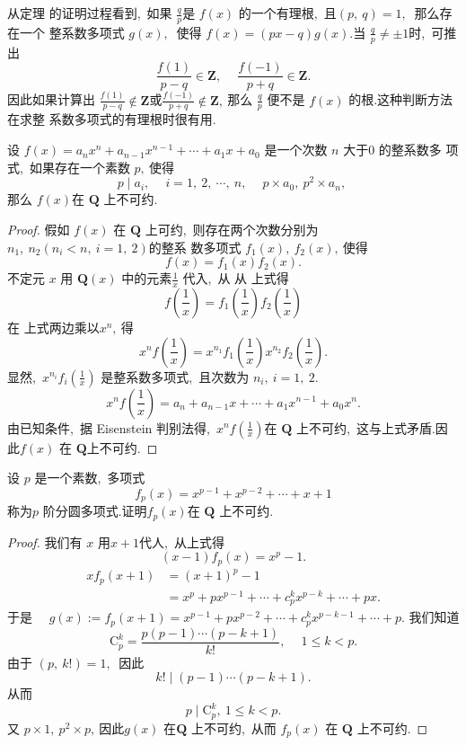 \begin{note}
	从定理  的证明过程看到,\  如果 $ \frac{q}{p}  $是  $f(x)$  的一个有理根,\  且$  (p,\  q)=1 ,\ $ 那么存在一个 整系数多项式 $ g(x) ,\ $ 使得 $ f(x)=(p x-q) g(x)  .$当 $ \frac{q}{p} \neq \pm 1  $时,\  可推出
	$$\frac{f(1)}{p-q} \in \mathbf{Z},\  \quad \frac{f(-1)}{p+q} \in \mathbf{Z} .$$
	因此如果计算出 $ \frac{f(1)}{p-q} \notin \mathbf{Z}  $或$  \frac{f(-1)}{p+q} \notin \mathbf{Z} ,\  $那么 $ \frac{q}{p}$  便不是 $ f(x) $ 的根.这种判断方法在求整 系数多项式的有理根时很有用.
\end{note}
\newpage
\begin{theorem}
	设  $f(x)=a_{n} x^{n}+a_{n-1} x^{n-1}+\cdots+a_{1} x+a_{0} $ 是一个次数  $n$  大于$ 0$ 的整系数多 项式,\ 如果存在一个素数  $p ,\  $使得
	$$p \mid a_{i},\  \quad i=1,\ 2,\  \cdots,\  n,\  \quad p \times a_{0},\  p^{2} \times a_{n},\ $$
	那么 $ f(x)  $在  $\mathbf{Q} $ 上不可约.
\end{theorem}
\begin{proof}
	假如 $ f(x)$  在 $ \mathbf{Q} $ 上可约,\  则存在两个次数分别为  $n_{1},\  n_{2}\left(n_{i}<n,\  i=1,\ 2\right)  $的整系 数多项式 $ f_{1}(x),\  f_{2}(x) ,\  $使得
	$$f(x)=f_{1}(x) f_{2}(x) .$$
	不定元  $x $ 用 $ \mathbf{Q}(x)$  中的元素$  \frac{1}{x}$  代入,\ 从 从 上式得
	$$f\left(\frac{1}{x}\right)=f_{1}\left(\frac{1}{x}\right) f_{2}\left(\frac{1}{x}\right)$$
	在 上式两边乘以$  x^{n} ,\  $得
	$$x^{n} f\left(\frac{1}{x}\right)=x^{n_{1}} f_{1}\left(\frac{1}{x}\right) x^{n_{2}} f_{2}\left(\frac{1}{x}\right) .$$
	显然,\  $ x^{n_{i}} f_{i}\left(\frac{1}{x}\right) $ 是整系数多项式,\  且次数为  $n_{i},\  i=1,\ 2  .$
	$$x^{n} f\left(\frac{1}{x}\right)=a_{n}+a_{n-1} x+\cdots+a_{1} x^{n-1}+a_{0} x^{n} .$$
	由已知条件,\  据 Eisenstein 判别法得,\  $ x^{n} f\left(\frac{1}{x}\right)  $在 $ \mathbf{Q} $ 上不可约,\  这与上式矛盾.因此$  f(x)$  在 $ \mathbf{Q}  $上不可约.
\end{proof}
\newpage
\begin{problem}
	设 $ p$  是一个素数,\  多项式
	$$f_{p}(x)=x^{p-1}+x^{p-2}+\cdots+x+1$$
	称为$  p$  阶分圆多项式.证明$  f_{p}(x)  $在  $\mathbf{Q} $ 上不可约.
\end{problem}
\begin{proof}
	我们有
	$x $ 用$  x+1  $代人,\  从上式得
	$$(x-1) f_{p}(x)=x^{p}-1 .$$
	$$\begin{aligned}
		x f_{p}(x+1) & =(x+1)^{p}-1 \\
		& =x^{p}+p x^{p-1}+\cdots+c_{p}^{k} x^{p-k}+\cdots+p x .
	\end{aligned}$$
	于是 $ \quad g(x):=f_{p}(x+1)=x^{p-1}+p x^{p-2}+\cdots+c_{p}^{k} x^{p-k-1}+\cdots+p .$
	我们知道
	$$\mathrm{C}_{p}^{k}=\frac{p(p-1) \cdots(p-k+1)}{k !},\  \quad 1 \leqslant k<p .$$
	由于 $ (p,\  k !)=1 ,\ $ 因此
	$$k ! \mid(p-1) \cdots(p-k+1) .$$
	从而 
	$$  p \mid \mathrm{C}_{p}^{k},\  1 \leqslant k<p .$$
	又 $ p \times 1,\  p^{2} \times p ,\  $因此$  g(x) $ 在$  \mathbf{Q}$  上不可约,\  从而 $ f_{p}(x) $ 在  $\mathbf{Q} $ 上不可约.
\end{proof}

